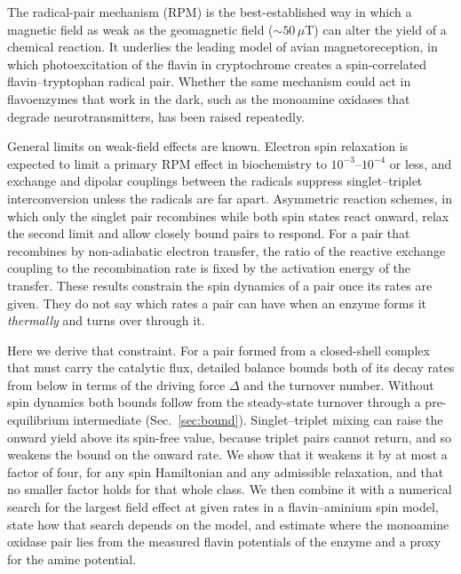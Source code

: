 \documentclass[aip,jcp,amsmath,amssymb,reprint]{revtex4-1}
\begin{document}
The radical-pair mechanism (RPM) is the best-established way in which a
magnetic field as weak as the geomagnetic field ($\sim50\,\mu$T) can alter
the yield of a chemical reaction.\cite{Steiner1989,Hore2016} It underlies the
leading model of avian magnetoreception, in which photoexcitation of the flavin
in cryptochrome creates a spin-correlated flavin--tryptophan radical
pair.\cite{Ritz2000,Maeda2012,Xu2021} Whether the same mechanism could act in
flavoenzymes that work in the dark, such as the monoamine oxidases that degrade
neurotransmitters, has been raised repeatedly.\cite{Jones2009,ZadehHaghighi2022}

General limits on weak-field effects are known. Electron spin relaxation is
expected to limit a primary RPM effect in biochemistry to
$10^{-3}$--$10^{-4}$ or less,\cite{Binhi2025} and exchange and dipolar couplings between the radicals
suppress singlet--triplet interconversion unless the radicals are far
apart.\cite{Efimova2008} Asymmetric reaction schemes, in which only the singlet
pair recombines while both spin states react onward, relax the second limit and
allow closely bound pairs to respond.\cite{Denton2024} For a pair that recombines
by non-adiabatic electron transfer, the ratio of the reactive exchange coupling
to the recombination rate is fixed by the activation energy of the
transfer.\cite{Fay2018} These results constrain the spin dynamics of a pair once
its rates are given. They do not say which rates a pair can have when an enzyme
forms it \emph{thermally} and turns over through it.

Here we derive that constraint. For a pair formed from a closed-shell complex
that must carry the catalytic flux, detailed balance bounds both of its decay
rates from below in terms of the driving force $\Delta$ and the turnover number.
Without spin dynamics both bounds follow from the steady-state turnover through
a pre-equilibrium intermediate (Sec.~\ref{sec:bound}). Singlet--triplet mixing
can raise the onward yield above its spin-free value, because triplet pairs
cannot return, and so weakens the bound on the onward rate. We show that it
weakens it by at most a factor of four, for any spin Hamiltonian and any
admissible relaxation, and that no smaller factor holds for that whole class. We then combine it with
a numerical search for the largest field effect at given rates in a flavin--aminium
spin model, state how that search depends on the model, and estimate where the
monoamine oxidase pair lies from the measured flavin potentials of the enzyme and
a proxy for the amine potential.
\end{document}
